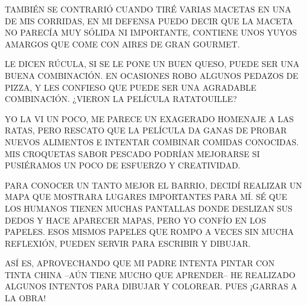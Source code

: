 \newpage
{}	

TAMBIÉN SE CONTRARIÓ CUANDO TIRÉ VARIAS MACETAS EN UNA DE MIS CORRIDAS, EN MI DEFENSA PUEDO DECIR QUE LA MACETA NO PARECÍA MUY SÓLIDA NI IMPORTANTE, CONTIENE UNOS YUYOS AMARGOS QUE COME CON AIRES DE GRAN GOURMET.

LE DICEN RÚCULA, SI SE LE PONE UN BUEN QUESO, PUEDE SER UNA BUENA COMBINACIÓN. EN OCASIONES ROBO ALGUNOS PEDAZOS DE PIZZA, Y LES CONFIESO QUE PUEDE SER UNA AGRADABLE COMBINACIÓN. 		¿VIERON LA PELÍCULA RATATOUILLE?



YO LA VI UN POCO, ME PARECE UN EXAGERADO HOMENAJE A LAS RATAS, PERO RESCATO QUE LA PELÍCULA DA GANAS DE PROBAR NUEVOS ALIMENTOS E INTENTAR COMBINAR COMIDAS CONOCIDAS. MIS CROQUETAS SABOR PESCADO PODRÍAN MEJORARSE SI PUSIÉRAMOS UN POCO DE ESFUERZO Y CREATIVIDAD.


\newpage
{}
PARA CONOCER UN TANTO MEJOR EL BARRIO, DECIDÍ REALIZAR UN MAPA QUE MOSTRARA LUGARES IMPORTANTES PARA MÍ. SÉ QUE LOS HUMANOS TIENEN MUCHAS PANTALLAS DONDE DESLIZAN SUS DEDOS Y HACE APARECER MAPAS, PERO YO CONFÍO EN LOS PAPELES. ESOS MISMOS PAPELES QUE ROMPO A VECES SIN MUCHA REFLEXIÓN, PUEDEN SERVIR PARA ESCRIBIR Y DIBUJAR. 

ASÍ ES, APROVECHANDO QUE MI PADRE INTENTA PINTAR CON TINTA CHINA --AÚN TIENE MUCHO QUE APRENDER-- HE REALIZADO ALGUNOS INTENTOS PARA DIBUJAR Y COLOREAR. PUES ¡GARRAS A LA OBRA!

\newpage
{}


